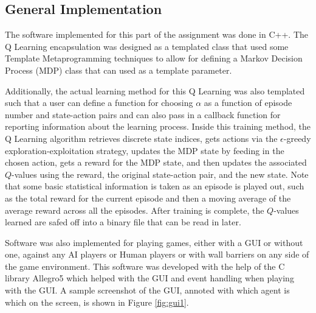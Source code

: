 \documentclass{article}[12pt]
\begin{document}
   \subsection{General Implementation}
   The software implemented for this part of the assignment was done in C++. The Q Learning encapsulation was designed as a templated class that used some Template Metaprogramming techniques to allow for defining a Markov Decision Process (MDP) class that can used as a template parameter. 
   
   Additionally, the actual learning method for this Q Learning was also templated such that a user can define a function for choosing $\alpha$ as a function of episode number and state-action pairs and can also pass in a callback function for reporting information about the learning process. Inside this training method, the Q Learning algorithm retrieves discrete state indices, gets actions via the $\epsilon$-greedy exploration-exploitation strategy, updates the MDP state by feeding in the chosen action, gets a reward for the MDP state, and then updates the associated $Q$-values using the reward, the original state-action pair, and the new state. Note that some basic statistical information is taken as an episode is played out, such as the total reward for the current episode and then a moving average of the average reward across all the episodes. After training is complete, the $Q$-values learned are safed off into a binary file that can be read in later.
   
   Software was also implemented for playing games, either with a GUI or without one, against any AI players or Human players or with wall barriers on any side of the game environment. This software was developed with the help of the C library Allegro5 which helped with the GUI and event handling when playing with the GUI. A sample screenshot of the GUI, annoted with which agent is which on the screen, is shown in Figure \ref{fig:gui1}.
   
\end{document}
